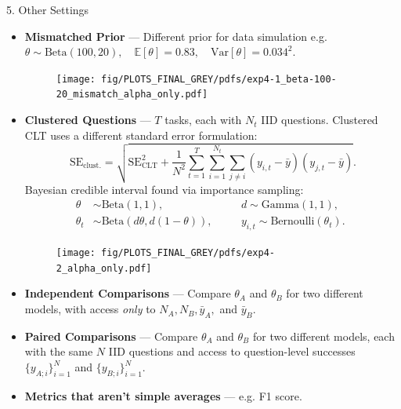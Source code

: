 \documentclass[final]{beamer}
\newlength{\colwidth}
\begin{document}
\begin{frame}[fragile]
\begin{columns}[t]
\begin{column}{\colwidth}
\begin{exampleblock}{5. Other Settings}
    \begin{itemize}
      \item \textbf{Mismatched Prior} --- Different prior for data simulation e.g. 
      $\theta \sim \text{Beta}(100,20), \quad \mathbb{E}[\theta] = 0.83, \quad \text{Var}[\theta] = 0.034^2.$ \\
      \begin{figure}
        \centering
        \texttt{[image: fig/PLOTS\_FINAL\_GREY/pdfs/exp4-1\_beta-100-20\_mismatch\_alpha\_only.pdf]}
      \end{figure}
      \item \textbf{Clustered Questions} --- $T$ tasks, each with $N_t$ IID questions.
      Clustered CLT uses a different standard error formulation:
      $$
      \text{SE}_\text{clust.} = \sqrt{\text{SE}_\text{CLT}^2 + \frac{1}{N^2}\sum_{t=1}^T \sum_{i=1}^{N_t} \sum_{j \neq i} (y_{i,t} - \bar{y})(y_{j,t} - \bar{y})}.
      $$
      Bayesian credible interval found via importance sampling:
      $$
        \begin{aligned}
        \theta &\sim \text{Beta}(1, 1), \quad 
        &&d \sim \text{Gamma}(1, 1), \quad \\
        \theta_t &\sim \text{Beta}(d \theta, d (1-\theta)), \quad
        &&y_{i,t} \sim \text{Bernoulli}(\theta_t).
        \end{aligned}
      $$
      
      \begin{figure}
        \centering
        \texttt{[image: fig/PLOTS\_FINAL\_GREY/pdfs/exp4-2\_alpha\_only.pdf]}
      \end{figure}
      \item \textbf{Independent Comparisons} --- Compare $\theta_A$ and $\theta_B$ for two different models, with access \textit{only} to $N_A, N_B, \bar{y}_A,$ and $\bar{y}_B$.
      \item \textbf{Paired Comparisons} --- Compare $\theta_A$ and $\theta_B$ for two different models, each with the same $N$ IID questions and access to question-level successes $\{y_{A;i}\}_{i=1}^N$ and $\{y_{B;i}\}_{i=1}^N$.
      \item \textbf{Metrics that aren't simple averages} --- e.g. F1 score.
    \end{itemize}


\end{exampleblock}
\end{column}
\end{columns}
\end{frame}
\end{document}

